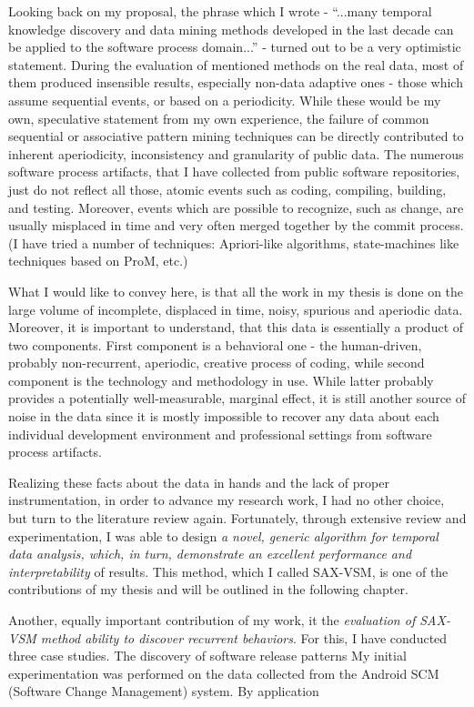 \documentclass[11pt,oneside]{article}
\numberwithin{equation}{subsection}
\begin{document}
Looking back on my proposal, the phrase which I wrote - ``...many temporal knowledge discovery and
data mining methods developed in the last decade can be applied to the software process domain...''
- turned out to be a very optimistic statement. During the evaluation of mentioned methods on the
real data, most of them produced insensible results, especially non-data adaptive ones - those which
assume sequential events, or based on a periodicity. While these would be my own, speculative
statement from my own experience, the failure of common sequential or associative pattern
mining techniques can be directly contributed to inherent aperiodicity, inconsistency and
granularity of public data. The numerous software process artifacts, that I have collected from
public software repositories, just do not reflect all those, atomic events such as coding,
compiling, building, and testing. Moreover, events which are possible to recognize, such as change,
are usually misplaced in time and very often merged together by the commit process. (I have tried a
number of techniques: Apriori-like algorithms, state-machines like techniques based on ProM, etc.)

What I would like to convey here, is that all the work in my thesis is done on the large volume
of incomplete, displaced in time, noisy, spurious and aperiodic data. Moreover, it is
important to understand, that this data is essentially a product of two components. First component
is a behavioral one - the human-driven, probably non-recurrent, aperiodic, creative process of
coding, while second component is the technology and methodology in use. While latter probably
provides a potentially well-measurable, marginal effect, it is still another source of noise in the
data since it is mostly impossible to recover any data about each individual development
environment and professional settings from software process artifacts.

Realizing these facts about the data in hands and the lack of proper instrumentation, in order to
advance my research work, I had no other choice, but turn to the literature review
again. Fortunately, through extensive review and experimentation, I was able to design \textit{a
novel, generic algorithm for temporal data analysis, which, in turn, demonstrate an excellent
performance and interpretability} of results. This method, which I called SAX-VSM, is one of the
contributions of my thesis and will be outlined in the following chapter.

Another, equally important contribution of my work, it the \textit{evaluation of SAX-VSM method
ability to discover recurrent behaviors}. For this, I have conducted three case studies. The
discovery of software release patterns My initial experimentation was performed on the data
collected from the Android SCM (Software Change Management) system. By application 
\end{document}
